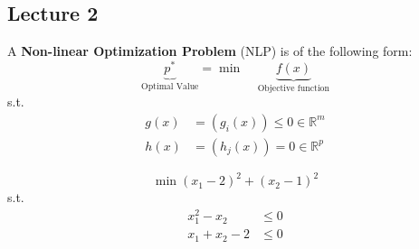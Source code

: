 
% 
\subsection{Lecture 2}
\begin{definition}
    A \textbf{Non-linear Optimization Problem} (NLP) is of the following form:
    $$\underbrace{p^*}_{\text{Optimal Value}} = \min\;\;\;\; \underbrace{f(x)}_{\text{Objective function}}$$
    s.t.
    \begin{align*}
        g(x) &= (g_i(x)) \leq 0 \in \mathbb R^m \\
        h(x) &= (h_j(x)) = 0 \in \mathbb R^p
    \end{align*}
\end{definition}
\begin{Example}
    $$\min (x_1 - 2)^2 + (x_2 - 1)^2$$
    s.t.
    \begin{align*}
        x_1^2 - x_2 &\leq 0 \tag{$g_1(x) \leq 0$}\\
        x_1 + x_2 - 2 &\leq 0 \tag{$g_2(x) \leq 0$}
    \end{align*}
\end{Example}

